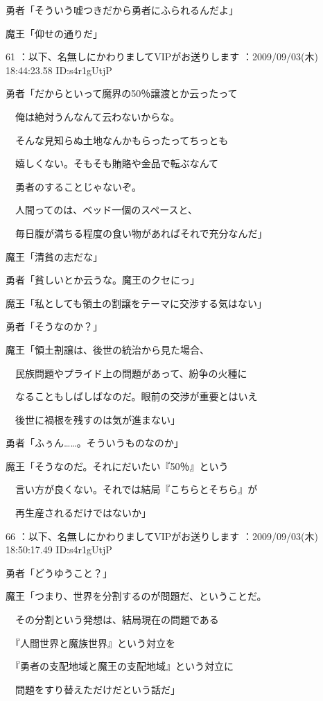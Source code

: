 \documentclass[a4j,twocolumn]{tarticle}
\begin{document}
勇者「そういう嘘つきだから勇者にふられるんだよ」\par{} 
魔王「仰せの通りだ」 

	
    
    

61 ：以下、名無しにかわりましてVIPがお送りします ：2009/09/03(木) 18:44:23.58 ID:s4r1gUtjP 


勇者「だからといって魔界の50％譲渡とか云ったって\par{} 
　俺は絶対うんなんて云わないからな。\par{} 
　そんな見知らぬ土地なんかもらったってちっとも\par{} 
　嬉しくない。そもそも賄賂や金品で転ぶなんて\par{} 
　勇者のすることじゃないぞ。\par{} 
　人間ってのは、ベッド一個のスペースと、\par{} 
　毎日腹が満ちる程度の食い物があればそれで充分なんだ」 



魔王「清貧の志だな」 



勇者「貧しいとか云うな。魔王のクセにっ」 



魔王「私としても領土の割譲をテーマに交渉する気はない」\par{} 
勇者「そうなのか？」 



魔王「領土割譲は、後世の統治から見た場合、\par{} 
　民族問題やプライド上の問題があって、紛争の火種に\par{}
　なることもしばしばなのだ。眼前の交渉が重要とはいえ\par{} 
　後世に禍根を残すのは気が進まない」 



勇者「ふぅん……。そういうものなのか」 



魔王「そうなのだ。それにだいたい『50％』という\par{} 
　言い方が良くない。それでは結局『こちらとそちら』が\par{} 
　再生産されるだけではないか」

	 

	

66 ：以下、名無しにかわりましてVIPがお送りします ：2009/09/03(木) 18:50:17.49 ID:s4r1gUtjP 


勇者「どうゆうこと？」\par{} 
魔王「つまり、世界を分割するのが問題だ、ということだ。\par{} 
　その分割という発想は、結局現在の問題である\par{} 
　『人間世界と魔族世界』という対立を\par{} 
　『勇者の支配地域と魔王の支配地域』という対立に\par{} 
　問題をすり替えただけだという話だ」 
\end{document}
